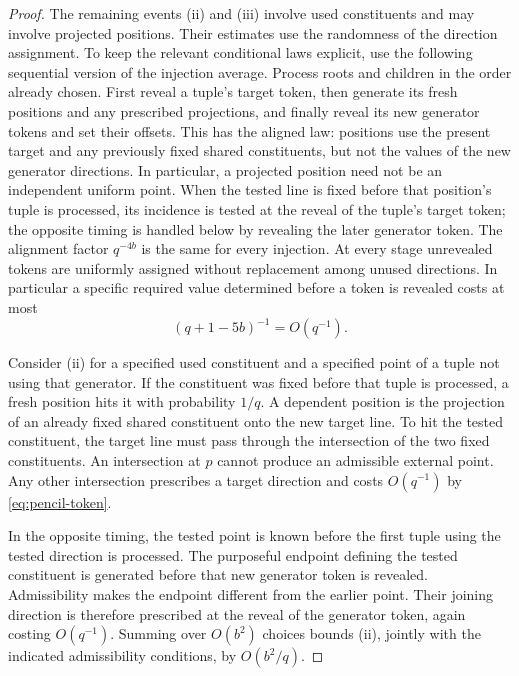 \begin{proof}
The remaining events (ii) and (iii) involve used constituents and may
involve projected positions.  Their estimates use the randomness of the
direction assignment.  To keep the relevant conditional laws explicit,
use the following sequential version of the injection average.  Process
roots and children in the order already chosen.  First
reveal a tuple's target token, then generate its fresh positions and any
prescribed projections, and finally reveal its new generator tokens and
set their offsets.  This has the aligned law: positions use the present
target and any previously fixed shared constituents, but not the values
of the new generator directions.  In particular, a projected position
need not be an independent uniform point.  When the tested line is fixed
before that position's tuple is processed, its incidence is tested at the
reveal of the tuple's target token; the opposite timing is handled below
by revealing the later generator token.  The alignment factor $q^{-4b}$
is the same for every injection.  At every stage
unrevealed tokens are uniformly
assigned without replacement among unused directions.  In particular a
specific required value determined before a token is revealed costs at
most
\begin{equation}\label{eq:pencil-token}
 (q+1-5b)^{-1}=O(q^{-1}).
\end{equation}

Consider (ii) for a specified used constituent and a specified point of
a tuple not using that generator.  If the constituent was fixed before
that tuple is processed, a fresh position hits it with probability $1/q$.
A dependent position is the projection of an already fixed shared
constituent onto the new target line.  To hit the tested constituent,
the target line must pass through the intersection of the two fixed
constituents.  An intersection at $p$ cannot produce an admissible external
point.  Any other intersection prescribes a target direction and costs
$O(q^{-1})$ by \eqref{eq:pencil-token}.

In the opposite timing, the tested point is known before the first tuple
using the tested direction is processed.  The purposeful endpoint defining
the tested constituent is generated before that new generator token is
revealed.  Admissibility makes the endpoint different from the earlier
point.  Their joining direction is therefore prescribed at the reveal of
the generator token, again costing $O(q^{-1})$.  Summing over $O(b^2)$
choices bounds (ii), jointly with the indicated admissibility conditions,
by $O(b^2/q)$.


\end{proof}
